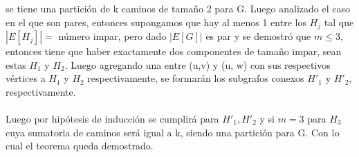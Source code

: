 \documentclass[12pt]{article}
\begin{document}
    se tiene una partici\'on de k caminos de tama\~no 2 para G. 
    Luego analizado el caso en el que son pares, entonces supongamos que hay al menos 1 entre los 
    ${H_j}$ tal que $|E [H_j]|=$ n\'umero impar, pero dado $|E [G]|$ es par y se demostr\'o que $m \leq 3$, entonces tiene que haber exactamente dos componentes de tama\~no impar, sean estas $H_1$ y $H_2$.  Luego agregando una entre (u,v) y (u, w) con sus respectivos v\'ertices a $H_1$ y $H_2$ respectivamente, se formar\'an  los subgrafos conexos $H'_1$ y $H'_2$, respectivamente.\\
\\
Luego por hip\'otesis de inducci\'on se cumplir\'a para $H'_1, H'_2$ y si $m = 3$ para $H_3$ cuya sumatoria de caminos ser\'a igual a k, siendo una partici\'on para G.  Con lo cual el teorema queda demostrado.\\
\end{document}
